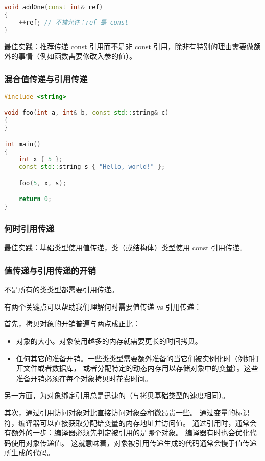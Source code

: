 \documentclass[../../LearnCpp.tex]{subfiles}
\begin{document}
\begin{lstlisting}[language=C++]
void addOne(const int& ref)
{
    ++ref; // 不被允许：ref 是 const
}
\end{lstlisting}

最佳实践：推荐传递 const 引用而不是非 const 引用，除非有特别的理由需要做额外的事情（例如函数需要修改入参的值）。

\subsubsection*{混合值传递与引用传递}

\begin{lstlisting}[language=C++]
#include <string>

void foo(int a, int& b, const std::string& c)
{
}

int main()
{
    int x { 5 };
    const std::string s { "Hello, world!" };

    foo(5, x, s);

    return 0;
}
\end{lstlisting}

\subsubsection*{何时引用传递}

最佳实践：基础类型使用值传递，类（或结构体）类型使用 const 引用传递。

\subsubsection*{值传递与引用传递的开销}

不是所有的类类型都需要引用传递。

有两个关键点可以帮助我们理解何时需要值传递 vs 引用传递：

首先，拷贝对象的开销普遍与两点成正比：

\begin{itemize}
    \item 对象的大小。对象使用越多的内存就需要更长的时间拷贝。
    \item 任何其它的准备开销。一些类类型需要额外准备的当它们被实例化时（例如打开文件或者数据库，
          或者分配特定的动态内存用以存储对象中的变量）。这些准备开销必须在每个对象拷贝时花费时间。
\end{itemize}

另一方面，为对象绑定引用总是迅速的（与拷贝基础类型的速度相同）。

其次，通过引用访问对象对比直接访问对象会稍微昂贵一些。
通过变量的标识符，编译器可以直接获取分配给变量的内存地址并访问值。
通过引用时，通常会有额外的一步：编译器必须先判定被引用的是哪个对象。
编译器有时也会优化代码使用对象传递值。
这就意味着，对象被引用传递生成的代码通常会慢于值传递所生成的代码。
\end{document}
